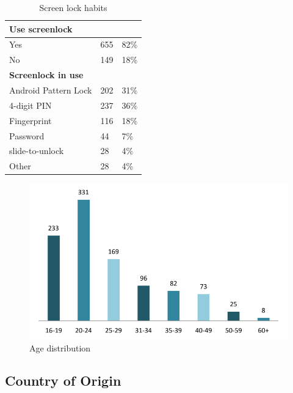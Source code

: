 \begin{table}[H]
{\begin{tabular}{ l | l l }
          \multicolumn{3}{l}{\bf Use screenlock} \\ \hline
          Yes & 655 & 82\% \\
          No & 149 & 18\% \\ \hline

          \multicolumn{3}{l}{\bf Screenlock in use} \\ \hline
          Android Pattern Lock & 202 & 31\% \\
          4-digit PIN & 237 & 36\% \\
          Fingerprint & 116 & 18\% \\
          Password & 44 & 7\% \\
          slide-to-unlock & 28 & 4\% \\
          Other & 28 & 4\% \\ \hline
        \end{tabular}
        \caption{Screen lock habits}
        \label{tab:screenlockHabits}
      }
    \end{table}

    \begin{figure}[H]
      \centering
      \includegraphics[scale=0.8]{pics/analysis/AgeDist.png}
      \caption{Age distribution}
      \label{fig:ageDistribution}
    \end{figure}

  \clearpage
	\subsection{Country of Origin} \label{sec:countryoforigin}

